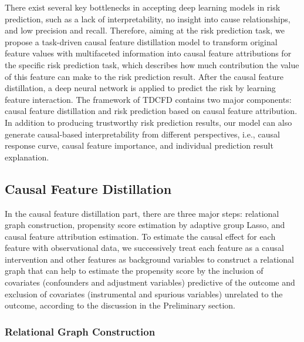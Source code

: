 \documentclass[letterpaper]{article} %
\theoremstyle{definition}
\theoremstyle{remark}
\begin{document}
There exist several key bottlenecks in accepting deep learning models in risk prediction, such as a lack of interpretability, no insight into cause relationships, and low precision and recall. Therefore, aiming at the risk prediction task, we propose a task-driven causal feature distillation model to transform original feature values with multifaceted information into causal feature attributions for the specific risk prediction task, which describes how much contribution the value of this feature can make to the risk prediction result. After the causal feature distillation, a deep neural network is applied to predict the risk by learning feature interaction. The framework of TDCFD contains two major components: causal feature distillation and risk prediction based on causal feature attribution. In addition to producing trustworthy risk prediction results, our model can also generate causal-based interpretability from different perspectives, i.e., causal response curve, causal feature importance, and individual prediction result explanation.


\subsection{Causal Feature Distillation}
\label{black_box}

In the causal feature distillation part, there are three major steps: relational graph construction, propensity score estimation by adaptive group Lasso, and causal feature attribution estimation. To estimate the causal effect for each feature with observational data, we successively treat each feature as a causal intervention and other features as background variables to construct a relational graph that can help to estimate the propensity score by the inclusion of covariates (confounders and adjustment variables) predictive of the outcome and exclusion of covariates (instrumental and spurious variables) unrelated to the outcome, according to the discussion in the Preliminary section. 


\subsubsection{Relational Graph Construction}
\label{prediction}
\end{document}
